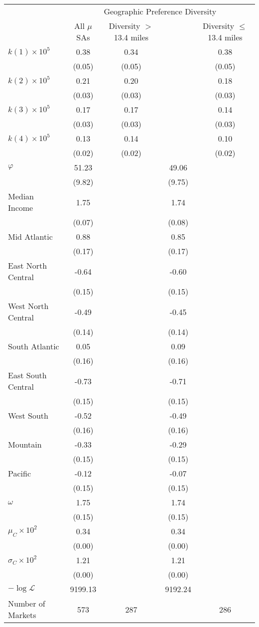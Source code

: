 \begin{tabular}{l c c c c}  
& \multicolumn{4}{c}{ Geographic Preference Diversity } \\
& All $\mu$SAs  & Diversity $>$ 13.4 miles & & Diversity $\leq$ 13.4 miles \\
$k(1) \times 10^5$ & 0.38 & 0.34 & & 0.38 \\
                    & (0.05) & (0.05) & & (0.05) \\
$k(2) \times 10^5$ & 0.21 & 0.20 & & 0.18 \\
                    & (0.03) & (0.03) & & (0.03) \\
$k(3) \times 10^5$ & 0.17 & 0.17 & & 0.14 \\
                    & (0.03) & (0.03) & & (0.03) \\
$k(4) \times 10^5$ & 0.13 & 0.14 & & 0.10 \\
                    & (0.02) & (0.02) & & (0.02) \\
$\varphi$ & 51.23 & & 49.06 &  \\ 
 & (9.82) & & (9.75) & \\ 
Median Income & 1.75 & & 1.74 &  \\ 
 & (0.07) & & (0.08) & \\ 
Mid Atlantic & 0.88 & & 0.85 &  \\ 
 & (0.17) & & (0.17) & \\ 
East North Central & -0.64 & & -0.60 &  \\ 
 & (0.15) & & (0.15) & \\ 
West North Central & -0.49 & & -0.45 &  \\ 
 & (0.14) & & (0.14) & \\ 
South Atlantic & 0.05 & & 0.09 &  \\ 
 & (0.16) & & (0.16) & \\ 
East South Central & -0.73 & & -0.71 &  \\ 
 & (0.15) & & (0.15) & \\ 
West South & -0.52 & & -0.49 &  \\ 
 & (0.16) & & (0.16) & \\ 
Mountain & -0.33 & & -0.29 &  \\ 
 & (0.15) & & (0.15) & \\ 
Pacific  & -0.12 & & -0.07 &  \\ 
 & (0.15) & & (0.15) & \\ 
$\omega$ & 1.75 & & 1.74 &  \\ 
 & (0.15) & & (0.15) & \\ 
$\mu_C\times 10^{2}$ & 0.34 & & 0.34 &  \\ 
 & (0.00) & & (0.00) & \\ 
$\sigma_C\times 10^{2}$ & 1.21 & & 1.21 &  \\ 
 & (0.00) & & (0.00) & \\ 
$-\log \mathcal L$ & 9199.13 & & 9192.24 & \\
Number of Markets & 573 & 287 & & 286 \\
\end{tabular}
